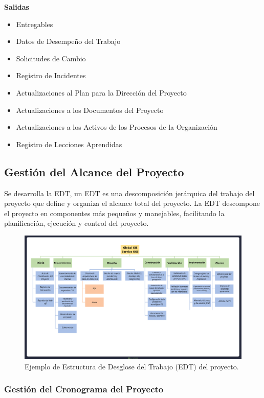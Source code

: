       \textbf{Salidas}
      \begin{itemize}
          \item Entregables
          \item Datos de Desempeño del Trabajo
          \item Solicitudes de Cambio
          \item Registro de Incidentes
          \item Actualizaciones al Plan para la Dirección del Proyecto
          \item Actualizaciones a los Documentos del Proyecto
          \item Actualizaciones a los Activos de los Procesos de la Organización
          \item Registro de Lecciones Aprendidas
      \end{itemize}

    \subsection{Gestión del Alcance del Proyecto}

    Se desarrolla la EDT, un EDT es una descomposición jerárquica del trabajo del proyecto que define y organiza el alcance total del proyecto. La EDT descompone el proyecto en componentes más pequeños y manejables, facilitando la planificación, ejecución y control del proyecto.

    \begin{figure}[H]
      \centering
      \includegraphics[width=1.5\textwidth,angle=90,trim=1cm 1cm 1cm 1cm,clip]{assets/EDT.png}
      \caption{Ejemplo de Estructura de Desglose del Trabajo (EDT) del proyecto.}
      \label{fig:edt}
    \end{figure}

    \subsubsection{Gestión del Cronograma del Proyecto}

